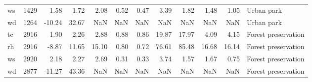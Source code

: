 \begin{table}
\begin{tabular}{lrrrrrrrrrrl}
ws &   1429 &   1.58 &   1.72 &   2.08 &  0.52 &  0.47 &   3.39 &   1.82 &   1.48 &   1.05 &           Urban park \\
wd &   1264 & -10.24 &  32.67 &    NaN &   NaN &   NaN &    NaN &    NaN &    NaN &    NaN &           Urban park \\
tc &   2916 &   1.90 &   2.26 &   2.88 &  0.88 &  0.86 &  19.87 &  17.97 &   4.09 &   4.15 &  Forest preservation \\
rh &   2916 &  -8.87 &  11.65 &  15.10 &  0.80 &  0.72 &  76.61 &  85.48 &  16.68 &  16.14 &  Forest preservation \\
ws &   2920 &   2.18 &   2.27 &   2.69 &  0.31 &  0.33 &   3.74 &   1.57 &   1.67 &   0.75 &  Forest preservation \\
wd &   2877 & -11.27 &  43.36 &    NaN &   NaN &   NaN &    NaN &    NaN &    NaN &    NaN &  Forest preservation \\
\bottomrule
\end{tabular}
\end{table}

